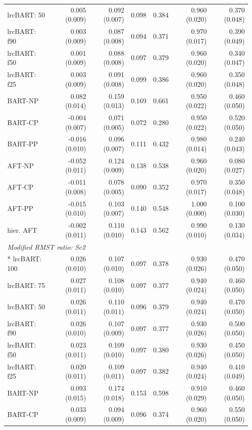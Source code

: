 \begin{landscape}
\begin{longtable}{lrrrrrr}
lrcBART: 50 & 0.005 (0.009) & 0.092 (0.007) & 0.098 & 0.384 & 0.960 (0.020) & 0.370 (0.048) \\
lrcBART: f90 & 0.003 (0.009) & 0.087 (0.008) & 0.094 & 0.371 & 0.970 (0.017) & 0.390 (0.049) \\
lrcBART: f50 & 0.001 (0.009) & 0.088 (0.008) & 0.097 & 0.379 & 0.960 (0.020) & 0.340 (0.047) \\
lrcBART: f25 & 0.003 (0.009) & 0.091 (0.008) & 0.099 & 0.386 & 0.960 (0.020) & 0.350 (0.048) \\
BART-NP & 0.082 (0.014) & 0.159 (0.013) & 0.169 & 0.661 & 0.950 (0.022) & 0.460 (0.050) \\
BART-CP & -0.004 (0.007) & 0.071 (0.005) & 0.072 & 0.280 & 0.950 (0.022) & 0.520 (0.050) \\
BART-PP & -0.016 (0.010) & 0.096 (0.007) & 0.111 & 0.432 & 0.980 (0.014) & 0.240 (0.043) \\
AFT-NP & -0.052 (0.011) & 0.124 (0.009) & 0.138 & 0.538 & 0.960 (0.020) & 0.080 (0.027) \\
AFT-CP & -0.011 (0.008) & 0.078 (0.005) & 0.090 & 0.352 & 0.970 (0.017) & 0.350 (0.048) \\
AFT-PP & -0.015 (0.010) & 0.103 (0.007) & 0.140 & 0.548 & 1.000 (0.000) & 0.100 (0.030) \\
hier. AFT & -0.002 (0.011) & 0.110 (0.010) & 0.143 & 0.562 & 0.990 (0.010) & 0.130 (0.034) \\
\multicolumn{7}{l}{\strut\textit{Modified RMST ratio: Sc2}}\\*
lrcBART: 100 & 0.026 (0.010) & 0.107 (0.010) & 0.097 & 0.378 & 0.930 (0.026) & 0.470 (0.050) \\
lrcBART: 75 & 0.027 (0.011) & 0.108 (0.010) & 0.097 & 0.377 & 0.940 (0.024) & 0.460 (0.050) \\
lrcBART: 50 & 0.026 (0.011) & 0.110 (0.011) & 0.096 & 0.379 & 0.940 (0.024) & 0.470 (0.050) \\
lrcBART: f90 & 0.026 (0.010) & 0.107 (0.009) & 0.097 & 0.377 & 0.930 (0.026) & 0.500 (0.050) \\
lrcBART: f50 & 0.023 (0.011) & 0.109 (0.010) & 0.097 & 0.380 & 0.930 (0.026) & 0.450 (0.050) \\
lrcBART: f25 & 0.020 (0.011) & 0.109 (0.011) & 0.097 & 0.382 & 0.940 (0.024) & 0.410 (0.049) \\
BART-NP & 0.093 (0.015) & 0.174 (0.018) & 0.153 & 0.598 & 0.910 (0.029) & 0.460 (0.050) \\
BART-CP & 0.033 (0.009) & 0.094 (0.009) & 0.096 & 0.374 & 0.960 (0.020) & 0.550 (0.050) \\

\end{longtable}
\end{landscape}
